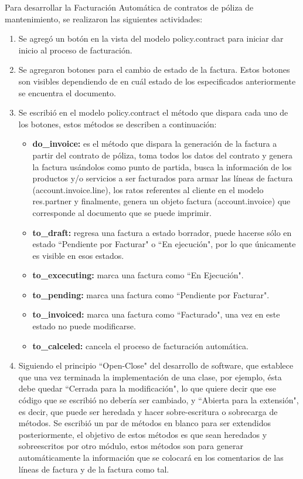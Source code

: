 \documentclass[a4paper, 12pt]{article}
\begin{document}
Para desarrollar la Facturación Automática de contratos de póliza de mantenimiento, se realizaron las siguientes actividades:
\begin{enumerate}
    \item Se agregó un botón en la vista del modelo policy.contract para iniciar dar inicio al proceso de facturación.
    \item Se agregaron botones para el cambio de estado de la factura. Estos botones son visibles dependiendo de en cuál estado de los especificados anteriormente se encuentra el documento.
    \item Se escribió en el modelo policy.contract el método que dispara cada uno de los botones, estos métodos se describen a continuación:
    \begin{itemize}
        \item \textbf{do\_invoice:} es el método que dispara la generación de la factura a partir del contrato de póliza, toma todos los datos del contrato y genera la factura usándolos como punto de partida, busca la información de los productos y/o servicios a ser facturados para armar las líneas de factura (account.invoice.line), los ratos referentes al cliente en el modelo res.partner y finalmente, genera un objeto factura (account.invoice) que corresponde al documento que se puede imprimir.
        \item \textbf{to\_draft:} regresa una factura a estado borrador, puede hacerse sólo en estado ``Pendiente por Facturar" o ``En ejecución", por lo que únicamente es visible en esos estados.
        \item \textbf{to\_excecuting:} marca una factura como ``En Ejecución".
        \item \textbf{to\_pending:} marca una factura como ``Pendiente por Facturar".
        \item \textbf{to\_invoiced:} marca una factura como ``Facturado", una vez en este estado no puede modificarse.
        \item \textbf{to\_calceled:} cancela el proceso de facturación automática.
    \end{itemize}
    \item Siguiendo el principio ``Open-Close" del desarrollo de software, que establece que una vez terminada la implementación de una clase, por ejemplo, ésta debe quedar ``Cerrada para la modificación", lo que quiere decir que ese código que se escribió no debería ser cambiado, y ``Abierta para la extensión", es decir, que puede ser heredada y hacer sobre-escritura o sobrecarga de métodos. Se escribió un par de métodos en blanco para ser extendidos posteriormente, el objetivo de estos métodos es que sean heredados y sobreescritos por otro módulo, estos métodos son para generar automáticamente la información que se colocará en los comentarios de las líneas de factura y de la factura como tal. 
\end{enumerate}
\end{document}
